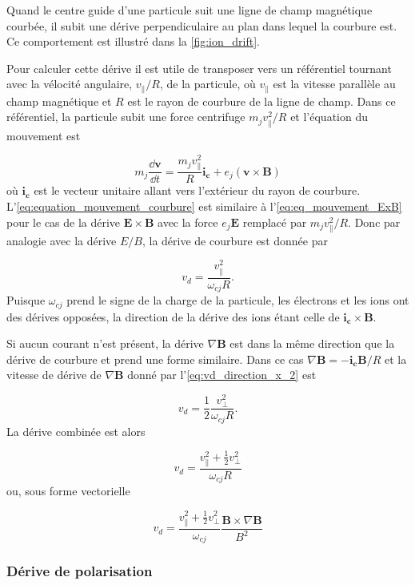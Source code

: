 \documentclass[main.tex]{subfiles}
\begin{document}
Quand le centre guide d'une particule suit une ligne de champ magnétique courbée, il subit une dérive perpendiculaire au plan dans lequel la courbure est.
Ce comportement est illustré dans la \autoref{fig:ion_drift}.

Pour calculer cette dérive il est utile de transposer vers un référentiel tournant avec la vélocité angulaire, \( v_\parallel/R \), de la particule, où \( v_\parallel \) est la vitesse parallèle au champ magnétique et \( R \) est le rayon de courbure de la ligne de champ.
Dans ce référentiel, la particule subit une force centrifuge \( m_j v_\parallel^2 / R \) et l'équation du mouvement est

\begin{equation}
	m_j \frac{\dd \bm{v}}{\dd t} = \frac{m_j v_\parallel^2}{R} \bm{i_c} + e_j \left( \bm{v} \times \bm{B} \right)
	\label{eq:equation_mouvement_courbure} 
\end{equation}
où \( \bm{i_c} \) est le vecteur unitaire allant vers l'extérieur du rayon de courbure.
L'\autoref{eq:equation_mouvement_courbure} est similaire à l'\autoref{eq:eq_mouvement_ExB} pour le cas de la dérive \( \bm{E} \times \bm{B} \) avec la force \( e_j \bm{E} \) remplacé par \( m_j v_\parallel^2/R \).
Donc par analogie avec la dérive \( E/B \), la dérive de courbure est donnée par

\[
	v_d = \frac{v_\parallel^2}{\omega_{cj} R}.
\]
Puisque \( \omega_{cj} \) prend le signe de la charge de la particule, les électrons et les ions ont des dérives opposées, la direction de la dérive des ions étant celle de \( \bm{i_c} \times \bm{B} \).

Si aucun courant n'est présent, la dérive \( \nabla \bm{B} \) est dans la même direction que la dérive de courbure et prend une forme similaire.
Dans ce cas \( \nabla \bm{B} = - \bm{i_c} \bm{B} / R \) et la vitesse de dérive de \( \nabla \bm{B} \) donné par l'\autoref{eq:vd_direction_x_2} est

\[
	v_d = \frac{1}{2} \frac{v_\perp^2}{\omega_{cj}R}.
\]
La dérive combinée est alors

\[
	v_d = \frac{v_\parallel^2 + \frac{1}{2} v_\perp^2}{\omega_{cj} R}
\]
ou, sous forme vectorielle

\begin{equation}
	v_d =\frac{v_\parallel^2 + \frac{1}{2} v_\perp^2}{\omega_{cj}} \frac{\bm{B} \times \nabla \bm{B}}{B^2}
	\label{eq:drift_velocity_forme_vectorielle}
\end{equation}

\FloatBarrier
\subsubsection*{Dérive de polarisation}
\end{document}
